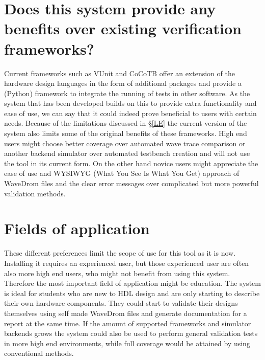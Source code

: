 \section{Does this system provide any benefits over existing verification frameworks?}
Current frameworks such as VUnit and CoCoTB offer an extension of the hardware design languages in the form of additional packages and provide a (Python) framework to integrate the running of tests in other software. As the system that has been developed builds on this to provide extra functionality and ease of use, we can say that it could indeed prove beneficial to users with certain needs. Because of the limitations discussed in §\ref{LE} the current version of the system also limits some of the original benefits of these frameworks.
\npar
High end users might choose better coverage over automated wave trace comparison or another backend simulator over automated testbench creation and will not use the tool in its current form. On the other hand novice users might appreciate the ease of use and WYSIWYG (What You See Is What You Get) approach of WaveDrom files and the clear error messages over complicated but more powerful validation methods.
\section{Fields of application}
These different preferences limit the scope of use for this tool as it is now. Installing it requires an experienced user, but those experienced user are often also more high end users, who might not benefit from using this system. Therefore the most important field of application might be education. The system is ideal for students who are new to HDL design and are only starting to describe their own hardware components. They could start to validate their designs themselves using self made WaveDrom files and generate documentation for a report at the same time.
\npar
If the amount of supported frameworks and simulator backends grows the system could also be used to perform general validation tests in more high end environments, while full coverage would be attained by using conventional methods.
